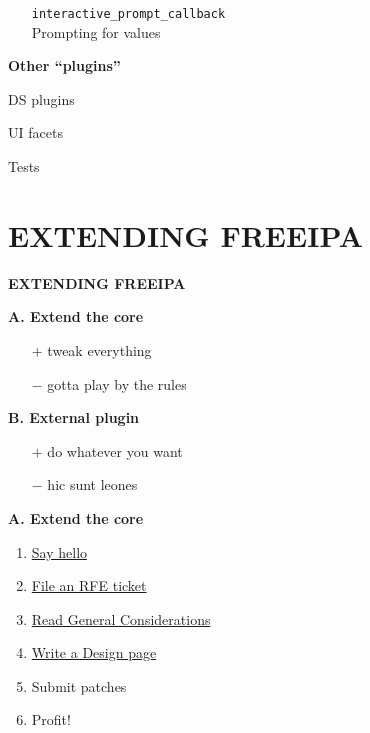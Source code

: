 \documentclass[20pt]{beamer}
\begin{document}
\begin{center}
\begin{frame}[fragile]
\begin{itemize}
    \item[]
    \verb+interactive_prompt_callback+\\
    Prompting for values
    \end{itemize}
\end{frame}

\begin{frame}[fragile]
    \textbf{\phantom{”}Other “plugins”}
    \bigskip\bigskip

    DS plugins

    UI facets

    Tests
\end{frame}

\section{EXTENDING FREEIPA}
\begin{frame}[fragile]
    \textbf{EXTENDING FREEIPA}
\end{frame}

\begin{frame}[fragile]
    \textbf{A. Extend the core}

    \bigskip

    \begin{itemize}
    \item[$+$] tweak everything
    \item[$-$] gotta play by the rules
    \end{itemize}

    \bigskip\bigskip

    \textbf{B. External plugin}

    \bigskip

    \begin{itemize}
    \item[$+$] do whatever you want
    \item[$-$] hic sunt leones
    \end{itemize}
\end{frame}

\begin{frame}[fragile]
    \textbf{A. Extend the core}
    \bigskip\bigskip

    \begin{enumerate}
    \item \href{www.redhat.com/mailman/listinfo/freeipa-devel}{Say hello}
    \item \href{https://fedorahosted.org/freeipa/report/3}{File an RFE ticket}
    \item \href{http://www.freeipa.org/page/General_considerations}{Read General Considerations}
    \item \href{http://www.freeipa.org/page/V3_Proposals}{Write a Design page}
    \item Submit patches
    \item Profit!
    \end{enumerate}
\end{frame}


\end{center}
\end{document}
